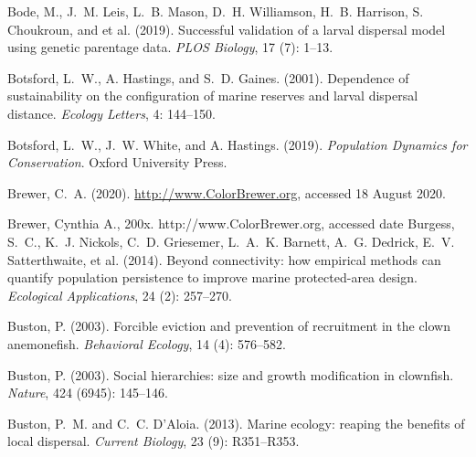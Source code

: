 \documentclass[12pt, oneside]{article}   	%
\begin{document}
\begin{thebibliography}{66}
Bode, M., J.~M. Leis, L.~B. Mason, D.~H. Williamson, H.~B.
  Harrison, S. Choukroun, and et al. (2019).
\newblock Successful validation of a larval dispersal model using genetic
  parentage data.
\newblock \emph{PLOS Biology}, 17 (7): 1--13.

Botsford, L.~W., A. Hastings, and S.~D. Gaines. (2001).
\newblock Dependence of sustainability on the configuration of marine reserves
  and larval dispersal distance.
\newblock \emph{Ecology Letters}, 4: 144--150.

Botsford, L.~W., J.~W. White, and A. Hastings. (2019).
\newblock \emph{Population Dynamics for Conservation}.
\newblock Oxford University Press.

Brewer, C.~A. (2020). 
\newblock \url{http://www.ColorBrewer.org},
\newblock accessed 18 August 2020.

Brewer, Cynthia A., 200x. http://www.ColorBrewer.org, accessed date
Burgess, S.~C., K.~J. Nickols, C.~D. Griesemer, L.~A.~K. Barnett,
  A.~G. Dedrick, E.~V. Satterthwaite, et al. (2014).
\newblock Beyond connectivity: how empirical methods can quantify population
  persistence to improve marine protected-area design.
\newblock \emph{Ecological Applications}, 24 (2): 257--270.

Buston, P. (2003{}).
\newblock Forcible eviction and prevention of recruitment in the clown
  anemonefish.
\newblock \emph{Behavioral Ecology}, 14 (4): 576--582.

Buston, P. (2003{}).
\newblock Social hierarchies: size and growth modification in clownfish.
\newblock \emph{Nature}, 424 (6945): 145--146.

Buston, P.~M. and C.~C. D'Aloia. (2013).
\newblock Marine ecology: reaping the benefits of local dispersal.
\newblock \emph{Current Biology}, 23 (9): R351--R353.


\end{thebibliography}
\end{document}
